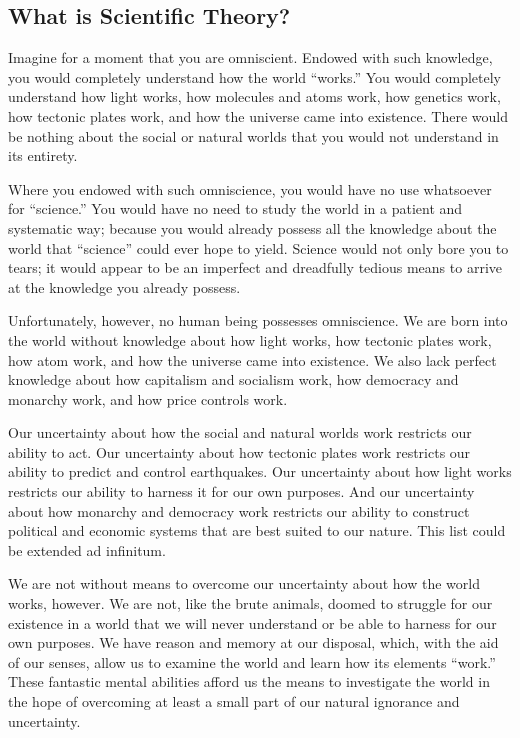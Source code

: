 \subsection{What is Scientific Theory?}

Imagine for a moment that you are omniscient. Endowed with such knowledge, you would completely understand how the world ``works.''  You would completely understand how light works, how molecules and atoms work, how genetics work, how tectonic plates work, and how the universe came into existence. There would be nothing about the social or natural worlds that you would not understand in its entirety.

Where you endowed with such omniscience, you would have no use whatsoever for ``science.''  You would have no need to study the world in a patient and systematic way; because you would already possess all the knowledge about the world that ``science'' could ever hope to yield. Science would not only bore you to tears; it would appear to be an imperfect and dreadfully tedious means to arrive at the knowledge you already possess.

Unfortunately, however, no human being possesses omniscience. We are born into the world without knowledge about how light works, how tectonic plates work, how atom work, and how the universe came into existence. We also lack perfect knowledge about how capitalism and socialism work, how democracy and monarchy work, and how price controls work.

Our uncertainty about how the social and natural worlds work restricts our ability to act. Our uncertainty about how tectonic plates work restricts our ability to predict and control earthquakes. Our uncertainty about how light works restricts our ability to harness it for our own purposes. And our uncertainty about how monarchy and democracy work restricts our ability to construct political and economic systems that are best suited to our nature. This list could be extended ad infinitum.

We are not without means to overcome our uncertainty about how the world works, however. We are not, like the brute animals, doomed to struggle for our existence in a world that we will never understand or be able to harness for our own purposes. We have reason and memory at our disposal, which, with the aid of our senses, allow us to examine the world and learn how its elements ``work.'' These fantastic mental abilities afford us the means to investigate the world in the hope of overcoming at least a small part of our natural ignorance and uncertainty.

